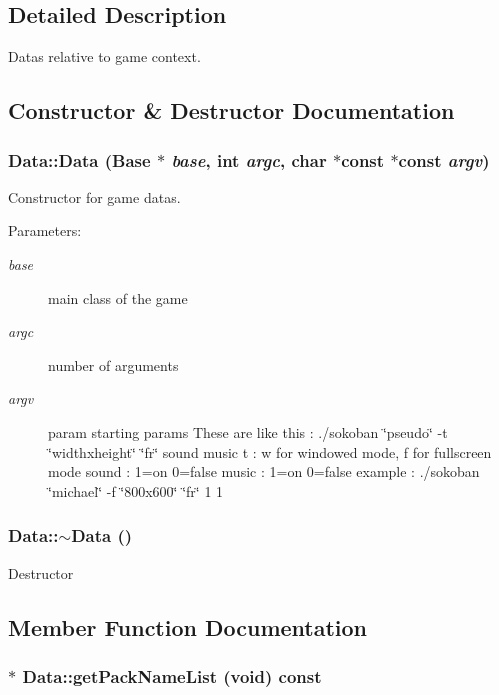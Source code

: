 \subsection{Detailed Description}
Datas relative to game context. 

\subsection{Constructor \& Destructor Documentation}
\subsubsection{\setlength{\rightskip}{0pt plus 5cm}Data::Data (Base $\ast$ {\em base}, int {\em argc}, char $\ast$const $\ast$const  {\em argv})}\label{classData_e75d903f8aa84549e555d73733e2e3ea}


Constructor for game datas. \begin{Desc}
\item[Parameters:]
\begin{description}
\item[{\em base}]main class of the game \item[{\em argc}]number of arguments \item[{\em argv}]param starting params These are like this : ./sokoban \char`\"{}pseudo\char`\"{} -t \char`\"{}widthxheight\char`\"{} \char`\"{}fr\char`\"{} sound music t : w for windowed mode, f for fullscreen mode sound : 1=on 0=false music : 1=on 0=false example : ./sokoban \char`\"{}michael\char`\"{} -f \char`\"{}800x600\char`\"{} \char`\"{}fr\char`\"{} 1 1 \end{description}
\end{Desc}
\subsubsection{\setlength{\rightskip}{0pt plus 5cm}Data::$\sim$Data ()}\label{classData_ab31956423290f0d62dcca47ab4d16dd}


Destructor 

\subsection{Member Function Documentation}
\subsubsection{$\ast$ Data::getPackNameList (void) const\hspace{0.3cm}{\tt  [inline]}}\label{classData_975b98cc0209ec1e70af24c41ce06965}


